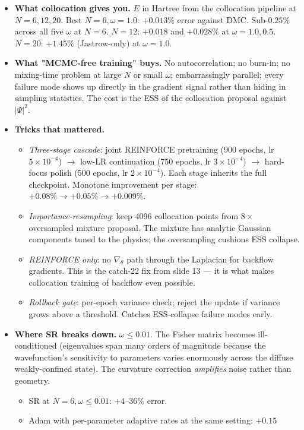 \documentclass[11pt]{article}
\begin{document}
\begin{itemize}
\item \textbf{What collocation gives you.} $E$ in Hartree from the collocation
pipeline at $N = 6, 12, 20$. Best $N{=}6, \omega{=}1.0$: $+0.013\%$
error against DMC. Sub-$0.25\%$ across all five $\omega$ at $N{=}6$.
$N{=}12$: $+0.018$ and $+0.028\%$ at $\omega = 1.0, 0.5$.
$N{=}20$: $+1.45\%$ (Jastrow-only) at $\omega = 1.0$.
\item \textbf{What "MCMC-free training" buys.} No autocorrelation; no burn-in; no
mixing-time problem at large $N$ or small $\omega$; embarrassingly
parallel; every failure mode shows up directly in the gradient signal
rather than hiding in sampling statistics. The cost is the ESS of the
collocation proposal against $|\Psi|^2$.
\item \textbf{Tricks that mattered.}
\begin{itemize}
\item \emph{Three-stage cascade}: joint REINFORCE pretraining (900 epochs,
lr $5 \times 10^{-4}$) $\to$ low-LR continuation (750 epochs, lr $3
    \times 10^{-4}$) $\to$ hard-focus polish (500 epochs, lr $2 \times
    10^{-4}$). Each stage inherits the full checkpoint. Monotone
improvement per stage: $+0.08\% \to +0.05\% \to +0.009\%$.
\item \emph{Importance-resampling}: keep 4096 collocation points from $8\times$
oversampled mixture proposal. The mixture has analytic Gaussian
components tuned to the physics; the oversampling cushions ESS
collapse.
\item \emph{REINFORCE only}: no $\nabla_\theta$ path through the Laplacian for
backflow gradients. This is the catch-22 fix from slide 13 --- it is
what makes collocation training of backflow even possible.
\item \emph{Rollback gate}: per-epoch variance check; reject the update if
variance grows above a threshold. Catches ESS-collapse failure modes
early.
\end{itemize}
\item \textbf{Where SR breaks down.} $\omega \le 0.01$. The Fisher matrix becomes
ill-conditioned (eigenvalues span many orders of magnitude because the
wavefunction's sensitivity to parameters varies enormously across the
diffuse weakly-confined state). The curvature correction \emph{amplifies}
noise rather than geometry.
\begin{itemize}
\item SR at $N = 6, \omega \le 0.01$: $+4$--$36\%$ error.
\item Adam with per-parameter adaptive rates at the same setting: $+0.15$

\end{itemize}
\end{itemize}
\end{document}

